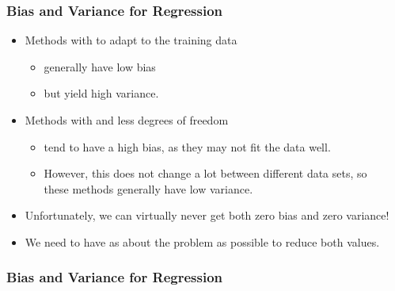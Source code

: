 \begin{frame}
  \frametitle{Bias and Variance for Regression \cont}


  \begin{itemize}
    \item Methods with  to adapt to the training data
      \begin{itemize}
        \item generally have low bias
        \item but yield high variance. \pause
      \end{itemize}
    \item Methods with  and less degrees of freedom 
      \begin{itemize}
        \item tend to have a high bias, as they may not fit the data well. 
        \item However, this does not change a lot between different data sets, so \\
          these methods generally have low variance. \pause
      \end{itemize}
    \item Unfortunately, we can virtually never get both zero bias and zero variance! \pause
    \item We need to have as  about the problem as possible to reduce both values.
  \end{itemize}
\end{frame}


\begin{frame}
  \frametitle{Bias and Variance for Regression \cont}

  \begin{center}
    \resizebox{0.6\linewidth}{!}{
      
    }
  \end{center}
\end{frame}


